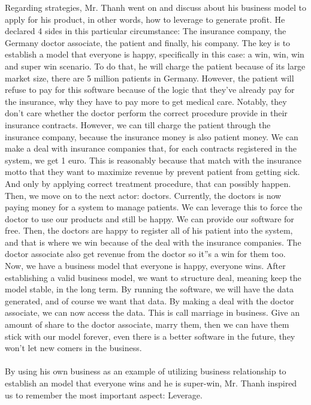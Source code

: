 \documentclass[a4paper, 11pt]{article} %
\begin{document}
	Regarding strategies, Mr. Thanh went on and discuss about his business model to apply for his product, in other words, how to leverage to generate profit. He declared 4 sides in this particular circumstance: The insurance company, the Germany doctor associate, the patient and finally, his company. The key is to establish a model that everyone is happy, specifically in this case: a win, win, win and super win scenario. To do that, he will charge the patient because of its large market size, there are 5 million patients in Germany. However, the patient will refuse to pay for this software because of the logic that they've already pay for the insurance, why they have to pay more to get medical care. Notably, they don't care whether the doctor perform the correct procedure provide in their insurance contracts. However, we can till charge the patient through the insurance company, because the insurance money is also patient money. We can make a deal with insurance companies that, for each contracts registered in the system, we get 1 euro. This is reasonably because that match with the insurance motto that they want to maximize revenue by prevent patient from getting sick. And only by applying correct treatment procedure, that can possibly happen. Then, we move on to the next actor: doctors. Currently, the doctors is now paying money for a system to manage patients. We can leverage this to force the doctor to use our products and still be happy. We can provide our software for free. Then, the doctors are happy to register all of his patient into the system, and that is where we win because of the deal with the insurance companies. The doctor associate also get revenue from the doctor so it''s a win for them too. Now, we have a business model that everyone is happy, everyone wins.
	After establishing a valid business model, we want to structure deal, meaning keep the model stable, in the long term. By running the software, we will have the data generated, and of course we want that data. By making a deal with the doctor associate, we can now access the data. This is call marriage in business. Give an amount of share to the doctor associate, marry them, then we can have them stick with our model forever, even there is a better software in the future, they won't let new comers in the business.
\\
\\
By using his own business as an example of utilizing business relationship to establish an model that everyone wins and he is super-win, Mr. Thanh inspired us to remember the most important aspect: Leverage.
\end{document}
